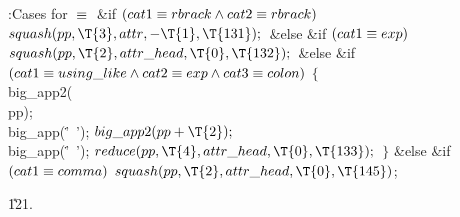 \B{}:Cases for \X${}\equiv{}$\6
\&{if} ${}(\\{cat1}\equiv\\{rbrack}\land\\{cat2}\equiv\\{rbrack}){}$\1\5
${}\\{squash}(\\{pp},\39\T{3},\39\\{attr},\39{-}\T{1},\39\T{131});{}$\2\6
\&{else} \&{if} ${}(\\{cat1}\equiv\\{exp}){}$\1\5
${}\\{squash}(\\{pp},\39\T{2},\39\\{attr\_head},\39\T{0},\39\T{132});{}$\2\6
\&{else} \&{if} ${}(\\{cat1}\E\\{using\_like}\W\\{cat2}\E\\{exp}\W\\{cat3}\E%
\\{colon}){}$\5
${}\{{}$\1\6
\\{big\_app2}(\\{pp});\6
\\{big\_app}(\.{'\ '});\6
${}\\{big\_app2}(\\{pp}+\T{2});{}$\6
\\{big\_app}(\.{'\ '});\6
${}\\{reduce}(\\{pp},\39\T{4},\39\\{attr\_head},\39\T{0},\39\T{133});{}$\6
\4${}\}{}$\2\6
\&{else} \&{if} ${}(\\{cat1}\equiv\\{comma}){}$\1\5
${}\\{squash}(\\{pp},\39\T{2},\39\\{attr\_head},\39\T{0},\39\T{145}){}$;\2\par
\U121.\fi


